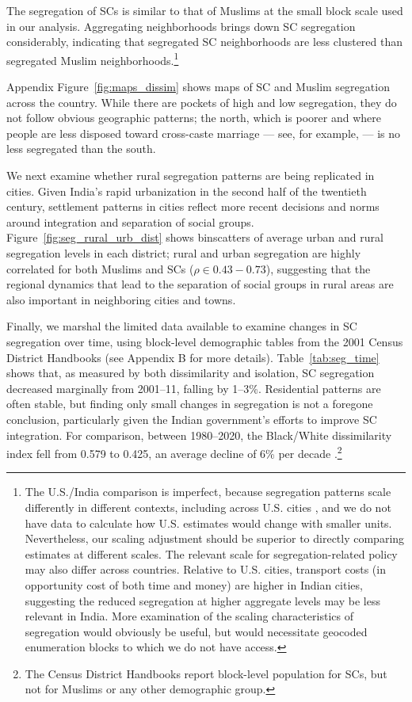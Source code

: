 \documentclass[12pt]{article}
\begin{document}
The segregation of SCs is similar to that of Muslims at the small block scale used in our analysis. Aggregating neighborhoods brings down SC segregation considerably, indicating that segregated SC neighborhoods are less clustered than segregated Muslim neighborhoods.\footnote{The U.S./India comparison is imperfect, because segregation patterns scale differently in different contexts, including across U.S. cities \citep{reardon2008}, and we do not have data to calculate how U.S. estimates would change with smaller units. Nevertheless, our scaling adjustment should be superior to directly comparing estimates at different scales. The relevant scale for segregation-related policy may also differ across countries. Relative to U.S. cities, transport costs (in opportunity cost of both time and money) are higher in Indian cities, suggesting the reduced segregation at higher aggregate levels may be less relevant in India. More examination of the scaling characteristics of segregation would obviously be useful, but would necessitate geocoded enumeration blocks to which we do not have access.}

Appendix Figure~\ref{fig:maps_dissim} shows maps of SC and Muslim segregation across the country. While there are pockets of high and low segregation, they do not follow obvious geographic patterns; the north, which is poorer and where people are less disposed toward cross-caste marriage --- see, for example, \citet{pew2021religion2} --- is no less segregated than the south.

We next examine whether rural segregation patterns are being replicated in cities. Given India's rapid urbanization in the second half of the twentieth century, settlement patterns in cities reflect more recent decisions and norms around integration and separation of social groups. Figure~\ref{fig:seg_rural_urb_dist} shows binscatters of average urban and rural segregation levels in each district; rural and urban segregation are highly correlated for both Muslims and SCs ($\rho \in 0.43-0.73$), suggesting that the regional dynamics that lead to the separation of social groups in rural areas are also important in neighboring cities and towns.

Finally, we marshal the limited data available to examine changes in SC segregation over time, using block-level demographic tables from the 2001 Census District Handbooks (see Appendix B for more details). Table~\ref{tab:seg_time} shows that, as measured by both dissimilarity and isolation, SC segregation decreased marginally from 2001--11, falling by 1--3\%. Residential patterns are often stable, but finding only small changes in segregation is not a foregone conclusion, particularly given the Indian government's efforts to improve SC integration. For comparison, between 1980--2020, the Black/White dissimilarity index fell from 0.579 to 0.425, an average decline of 6\% per decade \citep{logan2021persistence}.\footnote{The Census District Handbooks report block-level population for SCs, but not for Muslims or any other demographic group.} 
\end{document}
